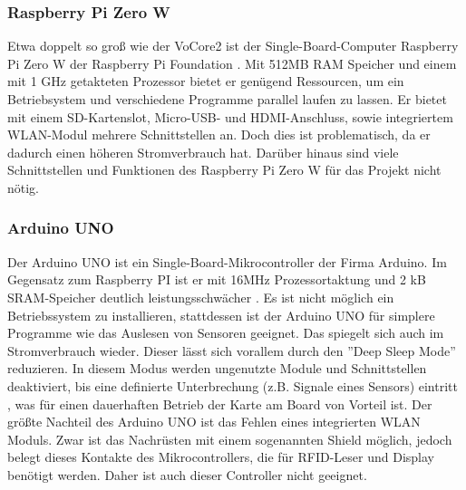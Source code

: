 \documentclass[12pt,titlepage]{scrartcl}
\begin{document}
			\subsubsection{Raspberry Pi Zero W}
			Etwa doppelt so groß wie der VoCore2 ist der Single-Board-Computer Raspberry Pi Zero W der Raspberry Pi Foundation \cite{pizerowgeneral}. Mit 512MB RAM Speicher und einem mit 1 GHz getakteten Prozessor bietet er genügend Ressourcen, um ein Betriebsystem und verschiedene Programme parallel laufen zu lassen. Er bietet mit einem SD-Kartenslot, Micro-USB- und HDMI-Anschluss, sowie integriertem WLAN-Modul mehrere Schnittstellen an. Doch dies ist problematisch, da er dadurch einen höheren Stromverbrauch hat. Darüber hinaus sind viele Schnittstellen und Funktionen des Raspberry Pi Zero W für das Projekt nicht nötig.
			\subsubsection{Arduino UNO} \label{uno}
			Der Arduino UNO ist ein Single-Board-Mikrocontroller der Firma Arduino. Im Gegensatz zum Raspberry PI ist er mit 16MHz Prozessortaktung und 2 kB SRAM-Speicher deutlich leistungsschwächer \cite{arduinounogeneral}. Es ist nicht möglich ein Betriebssystem zu installieren, stattdessen ist der Arduino UNO für simplere Programme wie das Auslesen von Sensoren geeignet. Das spiegelt sich auch im Stromverbrauch wieder. Dieser lässt sich vorallem durch den ''Deep Sleep Mode'' reduzieren. In diesem Modus werden ungenutzte Module und Schnittstellen deaktiviert, bis eine definierte Unterbrechung (z.B. Signale eines Sensors) eintritt \cite{arduinounosleep}, was für einen dauerhaften Betrieb der Karte am Board von Vorteil ist. Der größte Nachteil des Arduino UNO ist das Fehlen eines integrierten WLAN Moduls. Zwar ist das Nachrüsten mit einem sogenannten Shield möglich, jedoch belegt dieses Kontakte des Mikrocontrollers, die für RFID-Leser und Display benötigt werden. Daher ist auch dieser Controller nicht geeignet.			
\end{document}
